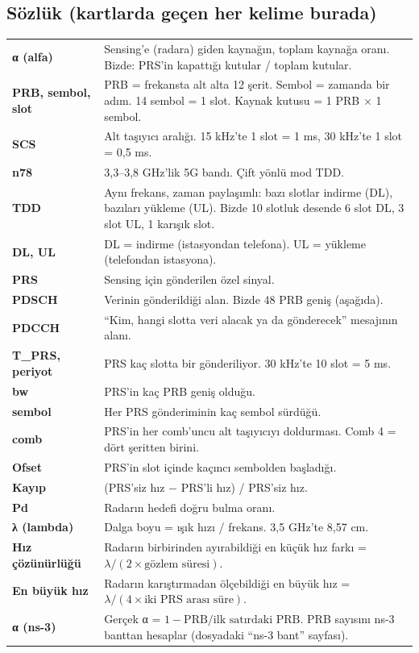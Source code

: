 \documentclass[11pt,a4paper]{article}
\begin{document}
\subsection*{Sözlük (kartlarda geçen her kelime burada)}
\begingroup\sffamily\small
\begin{tabular}{@{}p{2.8cm}p{13.2cm}@{}}
\toprule
\textbf{α (alfa)} & Sensing'e (radara) giden kaynağın, toplam kaynağa oranı. Bizde: PRS'in kapattığı kutular / toplam kutular. \\
\textbf{PRB, sembol, slot} & PRB = frekansta alt alta 12 şerit. Sembol = zamanda bir adım. 14 sembol = 1 slot. Kaynak kutusu = 1 PRB $\times$ 1 sembol. \\
\textbf{SCS} & Alt taşıyıcı aralığı. 15 kHz'te 1 slot = 1 ms, 30 kHz'te 1 slot = 0,5 ms. \\
\textbf{n78} & 3,3--3,8 GHz'lik 5G bandı. Çift yönlü mod TDD. \\
\textbf{TDD} & Aynı frekans, zaman paylaşımlı: bazı slotlar indirme (DL), bazıları yükleme (UL). Bizde 10 slotluk desende 6 slot DL, 3 slot UL, 1 karışık slot. \\
\textbf{DL, UL} & DL = indirme (istasyondan telefona). UL = yükleme (telefondan istasyona). \\
\textbf{PRS} & Sensing için gönderilen özel sinyal. \\
\textbf{PDSCH} & Verinin gönderildiği alan. Bizde 48 PRB geniş (aşağıda). \\
\textbf{PDCCH} & ``Kim, hangi slotta veri alacak ya da gönderecek'' mesajının alanı. \\
\textbf{T\_PRS, periyot} & PRS kaç slotta bir gönderiliyor. 30 kHz'te 10 slot = 5 ms. \\
\textbf{bw} & PRS'in kaç PRB geniş olduğu. \\
\textbf{sembol} & Her PRS gönderiminin kaç sembol sürdüğü. \\
\textbf{comb} & PRS'in her comb'uncu alt taşıyıcıyı doldurması. Comb 4 = dört şeritten birini. \\
\textbf{Ofset} & PRS'in slot içinde kaçıncı sembolden başladığı. \\
\textbf{Kayıp} & (PRS'siz hız $-$ PRS'li hız) / PRS'siz hız. \\
\textbf{Pd} & Radarın hedefi doğru bulma oranı. \\
\textbf{λ (lambda)} & Dalga boyu = ışık hızı / frekans. 3,5 GHz'te 8,57 cm. \\
\textbf{Hız çözünürlüğü} & Radarın birbirinden ayırabildiği en küçük hız farkı = $\lambda / (2 \times \text{gözlem süresi})$. \\
\textbf{En büyük hız} & Radarın karıştırmadan ölçebildiği en büyük hız = $\lambda / (4 \times \text{iki PRS arası süre})$. \\
\textbf{α (ns-3)} & Gerçek α = $1 - \text{PRB} / \text{ilk satırdaki PRB}$. PRB sayısını ns-3 banttan hesaplar (dosyadaki ``ns-3 bant'' sayfası). \\
\bottomrule
\end{tabular}
\endgroup
\end{document}
